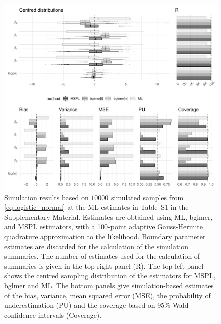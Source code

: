 \documentclass[11pt, a4paper]{article}
\theoremstyle{example} \newtheorem{example}{Example}[section]
\theoremstyle{theorem} \newtheorem{theorem}{Theorem}[section]
\begin{document}
\begin{figure}[H]
  \begin{center}
    \includegraphics[width = \textwidth]{Figures/simulation_results.pdf}
  \end{center}
  \caption{Simulation results based on $10000$ simulated samples from \eqref{eq:logistic_normal} at the ML estimates in Table~S1 in the Supplementary Material. Estimates are obtained using ML, bglmer, and MSPL estimators, with a 100-point adaptive Gauss-Hermite quadrature approximation to the likelihood. Boundary parameter estimates are discarded for the calculation of the simulation summaries. The number of estimates used for the calculation of summaries is given in the top right panel (R). The top left panel shows the centred sampling distribution of the estimators for MSPL, bglmer and ML. The bottom panels give simulation-based estimates of the bias, variance, mean squared error (MSE), the probability of underestimation (PU) and the coverage based on 95\% Wald-confidence intervals (Coverage).}
  \label{fig:culcita_simu0}
\end{figure}
\end{document}
